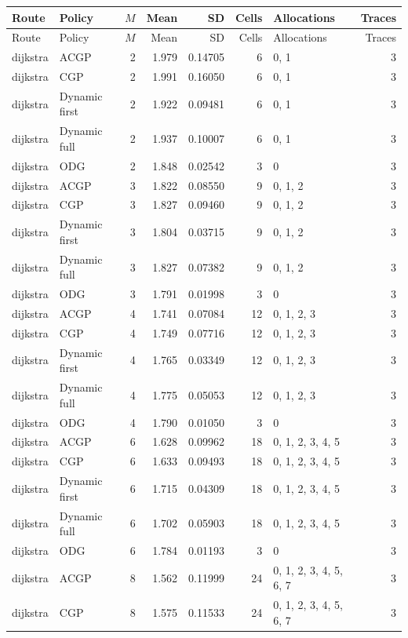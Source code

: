 \documentclass[10pt,a4paper]{article}
\begin{document}
\tiny\setlength{\tabcolsep}{2pt}\begin{longtable}{@{}p{23mm}p{29mm}rrrrp{36mm}r@{}}
\toprule Route & Policy & $M$ & Mean & SD & Cells & Allocations & Traces \\ \midrule\endfirsthead
\toprule Route & Policy & $M$ & Mean & SD & Cells & Allocations & Traces \\ \midrule\endhead
\bottomrule\endfoot
dijkstra & ACGP & 2 & 1.979 & 0.14705 & 6 & 0, 1 & 3 \\
dijkstra & CGP & 2 & 1.991 & 0.16050 & 6 & 0, 1 & 3 \\
dijkstra & Dynamic first & 2 & 1.922 & 0.09481 & 6 & 0, 1 & 3 \\
dijkstra & Dynamic full & 2 & 1.937 & 0.10007 & 6 & 0, 1 & 3 \\
dijkstra & ODG & 2 & 1.848 & 0.02542 & 3 & 0 & 3 \\
dijkstra & ACGP & 3 & 1.822 & 0.08550 & 9 & 0, 1, 2 & 3 \\
dijkstra & CGP & 3 & 1.827 & 0.09460 & 9 & 0, 1, 2 & 3 \\
dijkstra & Dynamic first & 3 & 1.804 & 0.03715 & 9 & 0, 1, 2 & 3 \\
dijkstra & Dynamic full & 3 & 1.827 & 0.07382 & 9 & 0, 1, 2 & 3 \\
dijkstra & ODG & 3 & 1.791 & 0.01998 & 3 & 0 & 3 \\
dijkstra & ACGP & 4 & 1.741 & 0.07084 & 12 & 0, 1, 2, 3 & 3 \\
dijkstra & CGP & 4 & 1.749 & 0.07716 & 12 & 0, 1, 2, 3 & 3 \\
dijkstra & Dynamic first & 4 & 1.765 & 0.03349 & 12 & 0, 1, 2, 3 & 3 \\
dijkstra & Dynamic full & 4 & 1.775 & 0.05053 & 12 & 0, 1, 2, 3 & 3 \\
dijkstra & ODG & 4 & 1.790 & 0.01050 & 3 & 0 & 3 \\
dijkstra & ACGP & 6 & 1.628 & 0.09962 & 18 & 0, 1, 2, 3, 4, 5 & 3 \\
dijkstra & CGP & 6 & 1.633 & 0.09493 & 18 & 0, 1, 2, 3, 4, 5 & 3 \\
dijkstra & Dynamic first & 6 & 1.715 & 0.04309 & 18 & 0, 1, 2, 3, 4, 5 & 3 \\
dijkstra & Dynamic full & 6 & 1.702 & 0.05903 & 18 & 0, 1, 2, 3, 4, 5 & 3 \\
dijkstra & ODG & 6 & 1.784 & 0.01193 & 3 & 0 & 3 \\
dijkstra & ACGP & 8 & 1.562 & 0.11999 & 24 & 0, 1, 2, 3, 4, 5, 6, 7 & 3 \\
dijkstra & CGP & 8 & 1.575 & 0.11533 & 24 & 0, 1, 2, 3, 4, 5, 6, 7 & 3 \\

\end{longtable}
\end{document}
